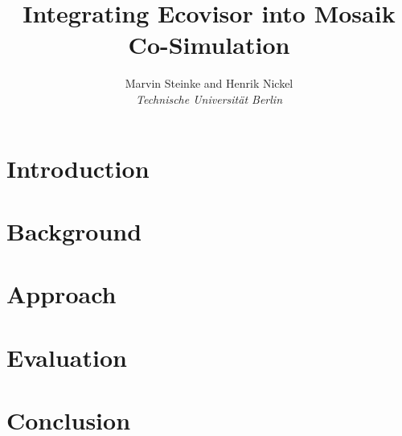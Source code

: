 \documentclass[a4paper, twoside]{IEEEtran}
\begin{document}
\title{Integrating Ecovisor into Mosaik Co-Simulation}

\author{Marvin Steinke and Henrik Nickel\\\textit{Technische Universität Berlin}}


\maketitle

\begin{abstract}
\end{abstract}

\section{Introduction}

\section{Background}

\section{Approach}

\section{Evaluation}

\section{Conclusion}




\end{document}
